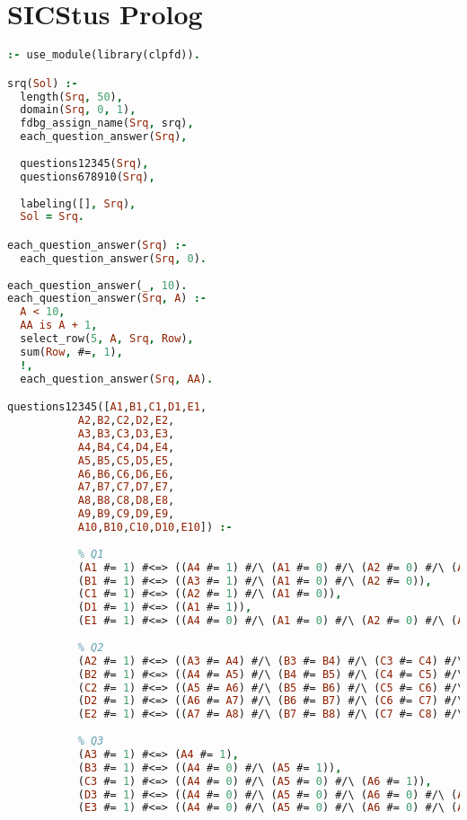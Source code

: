 \section{SICStus Prolog}
\label{implementation:sicstus}

\begin{lstlisting}[language=Prolog]
:- use_module(library(clpfd)).

srq(Sol) :-
  length(Srq, 50),
  domain(Srq, 0, 1),
  fdbg_assign_name(Srq, srq),
  each_question_answer(Srq),
  
  questions12345(Srq),
  questions678910(Srq),
  
  labeling([], Srq),
  Sol = Srq.

each_question_answer(Srq) :-
  each_question_answer(Srq, 0).
  
each_question_answer(_, 10).
each_question_answer(Srq, A) :-
  A < 10,
  AA is A + 1,
  select_row(5, A, Srq, Row),
  sum(Row, #=, 1),
  !,
  each_question_answer(Srq, AA).

questions12345([A1,B1,C1,D1,E1,
           A2,B2,C2,D2,E2,
           A3,B3,C3,D3,E3,
           A4,B4,C4,D4,E4,
           A5,B5,C5,D5,E5,
           A6,B6,C6,D6,E6,
           A7,B7,C7,D7,E7,
           A8,B8,C8,D8,E8,
           A9,B9,C9,D9,E9,
           A10,B10,C10,D10,E10]) :-
           
           % Q1
           (A1 #= 1) #<=> ((A4 #= 1) #/\ (A1 #= 0) #/\ (A2 #= 0) #/\ (A3 #= 0)),
           (B1 #= 1) #<=> ((A3 #= 1) #/\ (A1 #= 0) #/\ (A2 #= 0)),
           (C1 #= 1) #<=> ((A2 #= 1) #/\ (A1 #= 0)),
           (D1 #= 1) #<=> ((A1 #= 1)),
           (E1 #= 1) #<=> ((A4 #= 0) #/\ (A1 #= 0) #/\ (A2 #= 0) #/\ (A3 #= 0)),
           
           % Q2
           (A2 #= 1) #<=> ((A3 #= A4) #/\ (B3 #= B4) #/\ (C3 #= C4) #/\ (D3 #= D4) #/\ (E3 #= E4)),
           (B2 #= 1) #<=> ((A4 #= A5) #/\ (B4 #= B5) #/\ (C4 #= C5) #/\ (D4 #= D5) #/\ (E4 #= E5)),
           (C2 #= 1) #<=> ((A5 #= A6) #/\ (B5 #= B6) #/\ (C5 #= C6) #/\ (D5 #= D6) #/\ (E5 #= E6)),
           (D2 #= 1) #<=> ((A6 #= A7) #/\ (B6 #= B7) #/\ (C6 #= C7) #/\ (D6 #= D7) #/\ (E6 #= E7)),
           (E2 #= 1) #<=> ((A7 #= A8) #/\ (B7 #= B8) #/\ (C7 #= C8) #/\ (D7 #= D8) #/\ (E7 #= E8)),
           
           % Q3
           (A3 #= 1) #<=> (A4 #= 1),
           (B3 #= 1) #<=> ((A4 #= 0) #/\ (A5 #= 1)),
           (C3 #= 1) #<=> ((A4 #= 0) #/\ (A5 #= 0) #/\ (A6 #= 1)),
           (D3 #= 1) #<=> ((A4 #= 0) #/\ (A5 #= 0) #/\ (A6 #= 0) #/\ (A7 #= 1)),
           (E3 #= 1) #<=> ((A4 #= 0) #/\ (A5 #= 0) #/\ (A6 #= 0) #/\ (A7 #= 0) #/\ (A8 #= 1)),
           

\end{lstlisting}
